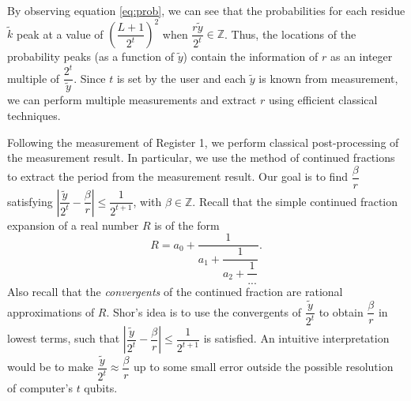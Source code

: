 \documentclass{article}
\begin{document}
By observing equation \eqref{eq:prob}, we can see that the probabilities for each residue $\widetilde{k}$ peak at a value of $\left(\dfrac{L+1}{2^t}\right)^2$ when $\dfrac{r\widetilde{y}}{2^t} \in \mathbb{Z}$. Thus, the locations of the probability peaks (as a function of $\widetilde{y}$) contain the information of $r$ as an integer multiple of $\dfrac{2^t}{\widetilde{y}}$. Since $t$ is set by the user and each $\widetilde{y}$ is known from measurement, we can perform multiple measurements and extract $r$ using efficient classical techniques. 

Following the measurement of Register 1, we perform classical post-processing of the measurement result. In particular, we use the method of continued fractions to extract the period from the measurement result. Our goal is to find $\dfrac{\beta}{r}$ satisfying $\left|\dfrac{\widetilde{y}}{2^t} - \dfrac{\beta}{r}\right|\leq\dfrac{1}{2^{t+1}}$, with $\beta \in \mathbb{Z}$. Recall that the simple continued fraction expansion of a real number $R$ is of the form
\begin{equation}
R = a_0 + \dfrac{1}{a_1+\dfrac{1}{a_2+\dfrac{1}{...}}}.
\end{equation}
Also recall that the \textit{convergents} of the continued fraction are rational approximations of $R$. Shor's idea is to use the convergents of $\dfrac{\widetilde{y}}{2^t}$ to obtain $\dfrac{\beta}{r}$ in lowest terms, such that $\left|\dfrac{\widetilde{y}}{2^t} - \dfrac{\beta}{r}\right|\leq\dfrac{1}{2^{t+1}}$ is satisfied. An intuitive interpretation would be to make $\dfrac{\widetilde{y}}{2^t} \approx \dfrac{\beta}{r}$ up to some small error outside the possible resolution of computer's $t$ qubits.  
\end{document}
